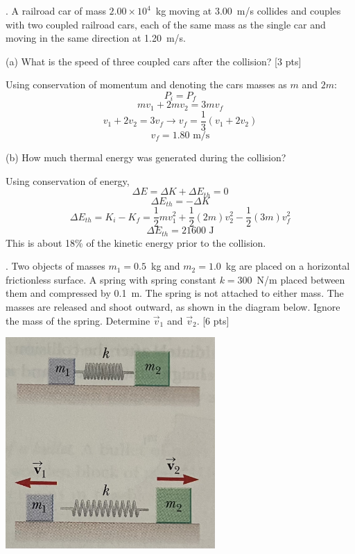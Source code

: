 \documentclass[11pt,letterpaper]{article}
\newcommand{\sol}[1]{{\color{NavyBlue} #1}}
\begin{document}
. A railroad car of mass $2.00\times 10^4$~kg moving at 3.00~m/s collides and couples with two coupled railroad cars, each of the same mass as the single car and moving in the same direction at 1.20~m/s. 

(a) What is the speed of three coupled cars after the collision? [3 pts]

\sol{Using conservation of momentum and denoting the cars masses as $m$ and $2m$:
$$P_i = P_f$$
$$mv_1 + 2mv_2 = 3mv_f$$
$$v_1+2v_2 = 3v_f \rightarrow v_f = \frac{1}{3}(v_1+2v_2)$$
$$\boxed{v_f = 1.80 \mbox{ m/s}}$$ 
}

\vspace{2cm}
(b) How much thermal energy was generated during the collision?

\sol{Using conservation of energy,
$$\Delta E = \Delta K + \Delta E_{th} = 0$$
$$\Delta E_{th} = -\Delta K$$
$$\Delta E_{th} = K_i - K_f = \frac{1}{2}mv_1^2 + \frac{1}{2}(2m)v_2^2 - \frac{1}{2}(3m)v_f^2$$
$$\boxed{\Delta E_{th} = 21600\mbox{ J}}$$
This is about 18\% of the kinetic energy prior to the collision.

}




. Two objects of masses $m_1=0.5$~kg and $m_2=1.0$~kg are placed on a horizontal frictionless surface. A spring with spring constant $k=300$~N/m placed between them and compressed by 0.1~m. The spring is not attached to either mass. The masses are released and shoot outward, as shown in the diagram below. Ignore the mass of the spring. Determine $\vec{v}_1$ and $\vec{v}_2$. [6 pts]

\includegraphics[width=8cm]{./exam2_4.jpg}
\end{document}

